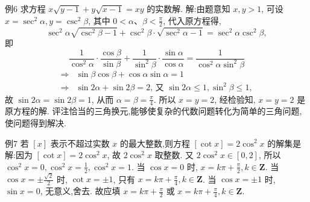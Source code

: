 例6 求方程 $x \sqrt{y-1}+y \sqrt{x-1}=x y$ 的实数解.
解:由题意知 $x, y>1$, 可设 $x=\sec ^2 \alpha, y=\csc ^2 \beta$, 其中 $0<\alpha 、 \beta<\frac{\pi}{2}$, 代入原方程得,
$$
\sec ^2 \alpha \sqrt{\csc ^2 \beta-1}+\csc ^2 \beta \cdot \sqrt{\sec ^2 \alpha-1}=\sec ^2 \alpha \csc ^2 \beta,
$$
即
$$
\frac{1}{\cos ^2 \alpha} \cdot \frac{\cos \beta}{\sin \beta}+\frac{1}{\sin ^2 \beta} \cdot \frac{\sin \alpha}{\cos \alpha}=\frac{1}{\cos ^2 \alpha \sin ^2 \beta}
$$
$$
\begin{array}{lc}
\Rightarrow & \sin \beta \cos \beta+\cos \alpha \sin \alpha=1 \\
\Rightarrow & \sin 2 \alpha+\sin 2 \beta=2 \text {, 又 } \sin 2 \alpha \leqslant 1, \sin ^2 \beta \leqslant 1,
\end{array}
$$
故 $\sin 2 \alpha=\sin 2 \beta=1$, 从而 $\alpha=\beta=\frac{\pi}{4}$.
所以 $x=y=2$, 经检验知, $x=y=2$ 是原方程的解.
评注恰当的三角换元,能够使复杂的代数问题转化为简单的三角问题,使问题得到解决.



例7 若 $[x]$ 表示不超过实数 $x$ 的最大整数,则方程 $[\cot x]=2 \cos ^2 x$ 的解集是
解:因为 $[\cot x]=2 \cos ^2 x$, 故 $2 \cos ^2 x$ 取整数.
又 $2 \cos ^2 x \in[0,2]$, 所以 $\cos ^2 x=0, \cos ^2 x=\frac{1}{2}, \cos ^2 x=1$.
当 $\cos x=0$ 时, $x=k \pi+\frac{\pi}{2}, k \in \mathbf{Z}$.
当 $\cos x= \pm \frac{\sqrt{2}}{2}$ 时, $\cot x= \pm 1$, 只有 $x=k \pi+\frac{\pi}{4}, k \in \mathbf{Z}$.
当 $\cos x= \pm 1$ 时, $\sin x=0$, 无意义,舍去.
故应填 $x=k \pi+\frac{\pi}{2}$ 或 $x=k \pi+\frac{\pi}{4}, k \in \mathbf{Z}$.



